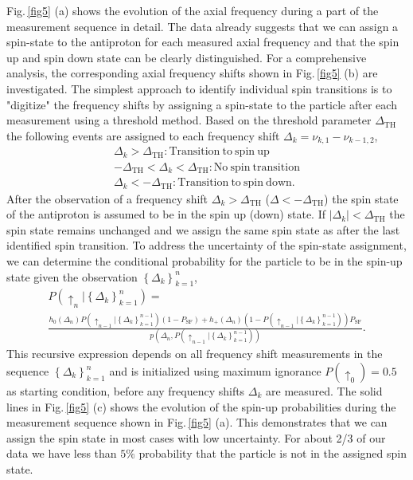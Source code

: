 \documentclass[preprint%
]{elsarticle}
\begin{document}
Fig.$\,$\ref{fig5} (a) shows the evolution of the axial frequency during a part of the measurement sequence in detail. 
The data already suggests that we can assign a spin-state to the antiproton for each measured axial frequency and that the spin up and spin down state can be clearly distinguished. For a comprehensive analysis, the corresponding axial frequency shifts shown in Fig.$\,$\ref{fig5} (b) are investigated. The simplest approach to identify individual spin transitions is to "digitize" the frequency shifts by assigning a spin-state to the particle after each measurement using a threshold method. Based on the threshold parameter $\Delta_{\mathrm{TH}}$ the following events are assigned to each frequency shift $\Delta_k=\nu_{k,1}-\nu_{k-1,2}$,
\begin{eqnarray}
\Delta_k > \Delta_{\mathrm{TH}}: \mathrm{Transition\ to\ spin\ up}\nonumber\\
- \Delta_{\mathrm{TH}} < \Delta_k < \Delta_{\mathrm{TH}}: \mathrm{No\ spin\ transition} 
\label{thcond} \\
\Delta_k < -\Delta_{\mathrm{TH}}: \mathrm{Transition\ to\ spin\ down}.\nonumber
\end{eqnarray}
After the observation of a frequency shift $\Delta_k>\Delta_{\mathrm{TH}}$ ($\Delta<-\Delta_{\mathrm{TH}}$) the spin state of the antiproton is assumed to be in the spin up (down) state. If $|\Delta_k|<\Delta_{\mathrm{TH}}$ the spin state remains unchanged and we assign the same spin state as after the last identified spin transition. To address the uncertainty of the spin-state assignment, we can determine the conditional probability for the particle to be in the spin-up state given the observation $\left\{\Delta_k\right\}_{k=1}^{n}$,
\begin{eqnarray}
P(\uparrow_n|\left\{\Delta_k\right\}_{k=1}^{n}) = \nonumber\\ 
\frac{h_0(\Delta_n) P(\uparrow_{n-1}|\left\{\Delta_k\right\}_{k=1}^{n-1})(1-P_\mathrm{SF})+h_+(\Delta_n) (1-P(\uparrow_{n-1}|\left\{\Delta_k\right\}_{k=1}^{n-1})) P_\mathrm{SF}}{p(\Delta_n,P(\uparrow_{n-1}|\left\{\Delta_k\right\}_{k=1}^{n-1}))}.
\end{eqnarray}
This recursive expression depends on all frequency shift measurements in the sequence $\left\{\Delta_k\right\}_{k=1}^{n}$ and is initialized using maximum ignorance $P(\uparrow_0) = 0.5$ as starting condition, before any frequency shifts $\Delta_k$ are measured. The solid lines in Fig.$\,$\ref{fig5} (c) shows the evolution of the spin-up probabilities during the measurement sequence shown in Fig.$\,$\ref{fig5} (a). This demonstrates that we can assign the spin state in most cases with low uncertainty. For about 2/3 of our data we have less than $5\%$ probability that the particle is not in the assigned spin state.
\end{document}
